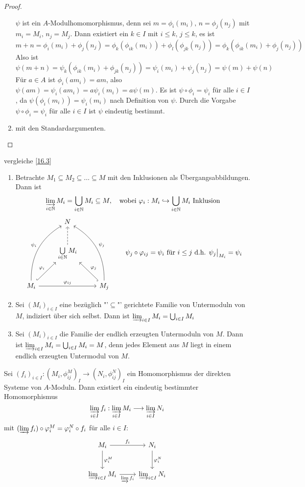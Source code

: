 \begin{proof}
\begin{enumerate}[label= \alph*)]
	$\psi$ ist ein $A$-Modulhomomorphismus, denn sei $m= \phi_i(m_i), \, n= \phi_j(n_j) $ mit $m_i = M_i, \, n_j = M_j$. Dann existiert ein $k\in I$ mit $i\leq k, \, j \le k$, es ist 
	$$m+n = \phi_i(m_i) + \phi_j(n_j) = \phi_k(\phi_{ik}(m_i)) + \phi_l(\phi_{jk}(n_j)) = \phi_k(\phi_{ik}(m_i) + \phi_j(n_j))$$
	Also ist 
	$$\psi(m+n) = \psi_k(\phi_{ik}(m_i) + \phi_{jk}(n_j)) = \psi_i(m_i) + \psi_{j}(n_j) = \psi(m) + \psi(n)$$
	Für $a\in A$ ist $\phi_i(am_i) = am$, also $\psi(am) = \psi_i(am_i) = a \psi_i(m_i) = a \psi(m)$. Es ist $\psi \circ \phi_i = \psi_i$ für alle $i\in I$, da $\psi(\phi_i(m_i)) = \psi_i(m_i)$ nach Definition von $\psi$. Durch die Vorgabe $\psi \circ \phi_i = \psi_i$ für alle $i\in I$ ist $\psi$ eindeutig bestimmt.
	\item mit den Standardargumenten.
	\end{enumerate}
\end{proof}
\begin{bsp} \label{16.7}
		vergleiche \ref{16.3}
	\begin{enumerate}[label= \alph*)]
		\item Betrachte $M_1 \subseteq M_2 \subseteq \ldots \subseteq M$ mit den Inklusionen als Übergangsabbildungen. Dann ist 
		$$\varinjlim_{i\in \N} M_i = \bigcup_{i\in \N} M_i \subseteq M, \quad \text{wobei }\phi_i :M_i \hookrightarrow \bigcup_{i\in \N}M_i \text{ Inklusion}$$
			$$\begin{tikzcd}[row sep = large]
		& N & \\
		& \bigcup\limits_{i\in \N}M_i \arrow[dashed]{u}& \\
		M_i \arrow[hook]{ur}{\phi_i} \arrow[bend left]{uur}{\psi_i} \arrow{rr}{\phi_{ij}} & & M_j \arrow[swap, hook]{ul}{\phi_j} \arrow[bend right, swap]{uul}{\psi_j}
		\end{tikzcd}\qquad \psi_j \circ \phi_{ij} = \psi_i \text{ für } i\leq j \text{ d.h. } \psi_j \big|_{M_i} = \psi_i$$
		\item Sei $(M_i)_{i\in I}$ eine bezüglich "'$\subseteq$"' gerichtete Familie von Untermoduln von $M$, indiziert über sich selbst. Dann ist $\varinjlim_{i\in I} M_i = \bigcup_{i\in I} M_i$
		\item Sei $(M_i)_{i\in I}$ die Familie der endlich erzeugten Untermoduln von $M$. Dann ist $\varinjlim_{i\in I} M_i = \bigcup_{i\in I} M_i = M$, denn jedes Element aus $M$ liegt in einem endlich erzeugten Untermodul von $M$.
	\end{enumerate}
\end{bsp}
\begin{bem}\label{16.8}
	Sei $(f_i)_{i\in I}:(M_i, \phi_{ij}^M)_I \to (N_i, \phi_{ij}^N)_I$ ein Homomorphismus der direkten Systeme von $A$-Moduln. Dann existiert ein eindeutig bestimmter Homomorphismus 
	$$\varinjlim_{i\in I} f_i: \varinjlim_{i\in I} M_i \longrightarrow \varinjlim_{i\in I} N_i$$
	mit $(\varinjlim f_i) \circ \phi_i^M = \phi_i^N \circ f_i $ für alle $i\in I$:
	$$\begin{tikzcd}[row sep = large]
	M_i \arrow{r}{f_i} \arrow{d}{\phi_i^M} & N_i \arrow{d}{\phi_i^N} \\
	\varinjlim_{i\in I} M_i \arrow[swap]{r}{\varinjlim f_i} & \varinjlim_{i\in I} N_i
	\end{tikzcd}$$
\end{bem}
